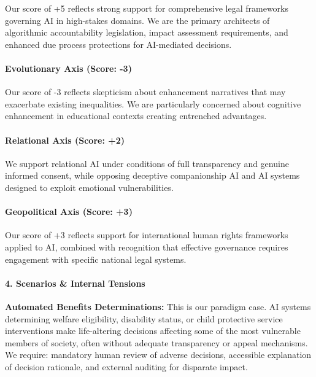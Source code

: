 Our score of +5 reflects strong support for comprehensive legal
frameworks governing AI in high-stakes domains. We are the primary
architects of algorithmic accountability legislation, impact assessment
requirements, and enhanced due process protections for AI-mediated
decisions.

\paragraph{Evolutionary Axis (Score:
-3)}\label{evolutionary-axis-score--3}

Our score of -3 reflects skepticism about enhancement narratives that
may exacerbate existing inequalities. We are particularly concerned
about cognitive enhancement in educational contexts creating entrenched
advantages.

\paragraph{Relational Axis (Score: +2)}\label{relational-axis-score-2}

We support relational AI under conditions of full transparency and
genuine informed consent, while opposing deceptive companionship AI and
AI systems designed to exploit emotional vulnerabilities.

\paragraph{Geopolitical Axis (Score:
+3)}\label{geopolitical-axis-score-3}

Our score of +3 reflects support for international human rights
frameworks applied to AI, combined with recognition that effective
governance requires engagement with specific national legal systems.

\paragraph{4. Scenarios \& Internal
Tensions}\label{scenarios-internal-tensions-5}

\textbf{Automated Benefits Determinations:} This is our paradigm case.
AI systems determining welfare eligibility, disability status, or child
protective service interventions make life-altering decisions affecting
some of the most vulnerable members of society, often without adequate
transparency or appeal mechanisms. We require: mandatory human review of
adverse decisions, accessible explanation of decision rationale, and
external auditing for disparate impact.

